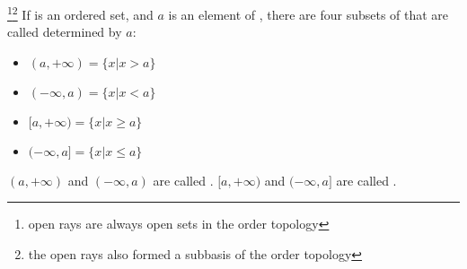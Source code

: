 \begin{definition}[ray]\label{def:Ray}\footnote{
      open rays are always open sets in the order topology
}\footnote{
      the open rays also formed a subbasis of the order topology
}
      If  is an ordered set, and $ a $ is an element of , there are four subsets of  that are called  determined by $ a $:
      \begin{itemize}
            \item $ (a,+\infty) = \{ x | x > a \} $
            \item $ (-\infty,a) = \{ x | x < a \} $
            \item $ [a,+\infty) = \{ x | x \ge a \} $
            \item $ (-\infty,a] = \{ x | x \le a \} $
      \end{itemize}

      $ (a,+\infty) $ and $ (-\infty,a) $ are called .
      $ [a,+\infty) $ and $ (-\infty,a] $ are called .
\end{definition}